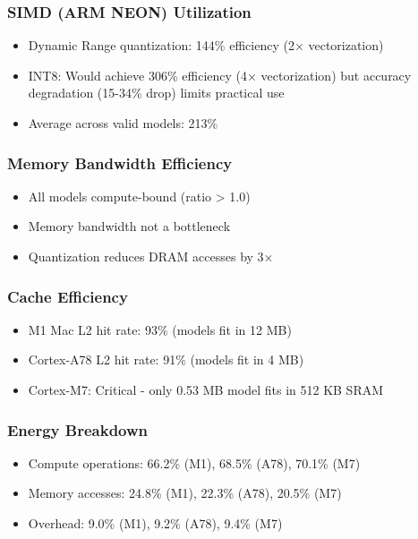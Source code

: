 \documentclass[10pt, a4paper]{article}
\begin{document}
\subsubsection{SIMD (ARM NEON) Utilization}
\begin{itemize}
    \item Dynamic Range quantization: 144\% efficiency (2× vectorization)
    \item INT8: Would achieve 306\% efficiency (4× vectorization) but accuracy degradation (15-34\% drop) limits practical use
    \item Average across valid models: 213\%
\end{itemize}

\subsubsection{Memory Bandwidth Efficiency}
\begin{itemize}
    \item All models compute-bound (ratio > 1.0)
    \item Memory bandwidth not a bottleneck
    \item Quantization reduces DRAM accesses by 3×
\end{itemize}

\subsubsection{Cache Efficiency}
\begin{itemize}
    \item M1 Mac L2 hit rate: 93\% (models fit in 12 MB)
    \item Cortex-A78 L2 hit rate: 91\% (models fit in 4 MB)
    \item Cortex-M7: Critical - only 0.53 MB model fits in 512 KB SRAM
\end{itemize}

\subsubsection{Energy Breakdown}
\begin{itemize}
    \item Compute operations: 66.2\% (M1), 68.5\% (A78), 70.1\% (M7)
    \item Memory accesses: 24.8\% (M1), 22.3\% (A78), 20.5\% (M7)
    \item Overhead: 9.0\% (M1), 9.2\% (A78), 9.4\% (M7)
\end{itemize}
\end{document}
